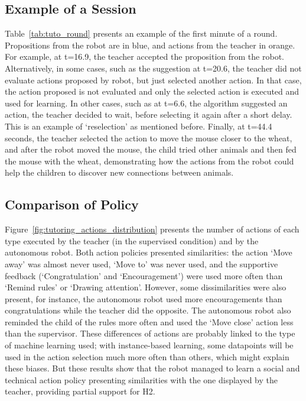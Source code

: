 \subsection{Example of a Session}

Table~\ref{tab:tuto_round} presents an example of the first minute of a round. Propositions from the robot are in blue, and actions from the teacher in orange. For example, at t=16.9, the teacher accepted the proposition from the robot. Alternatively, in some cases, such as the suggestion at t=20.6, the teacher did not evaluate actions proposed by robot, but just selected another action. In that case, the action proposed is not evaluated and only the selected action is executed and used for learning. In other cases, such as at t=6.6, the algorithm suggested an action, the teacher decided to wait, before selecting it again after a short delay. This is an example of `reselection' as mentioned before. Finally, at t=44.4 seconds, the teacher selected the action to move the mouse closer to the wheat, and after the robot moved the mouse, the child tried other animals and then fed the mouse with the wheat, demonstrating how the actions from the robot could help the children to discover new connections between animals.


\subsection{Comparison of Policy}

Figure~\ref{fig:tutoring_actions_distribution} presents the number of actions of each type executed by the teacher (in the supervised condition) and by the autonomous robot. Both action policies presented similarities: the action `Move away' was almost never used, `Move to' was never used, and the supportive feedback (`Congratulation' and `Encouragement') were used more often than `Remind rules' or `Drawing attention'. However, some dissimilarities were also present, for instance, the autonomous robot used more encouragements than congratulations while the teacher did the opposite. The autonomous robot also reminded the child of the rules more often and used the `Move close' action less than the supervisor. These differences of actions are probably linked to the type of machine learning used; with instance-based learning, some datapoints will be used in the action selection much more often than others, which might explain these biases. But these results show that the robot managed to learn a social and technical action policy presenting similarities with the one displayed by the teacher, providing partial support for H2.

